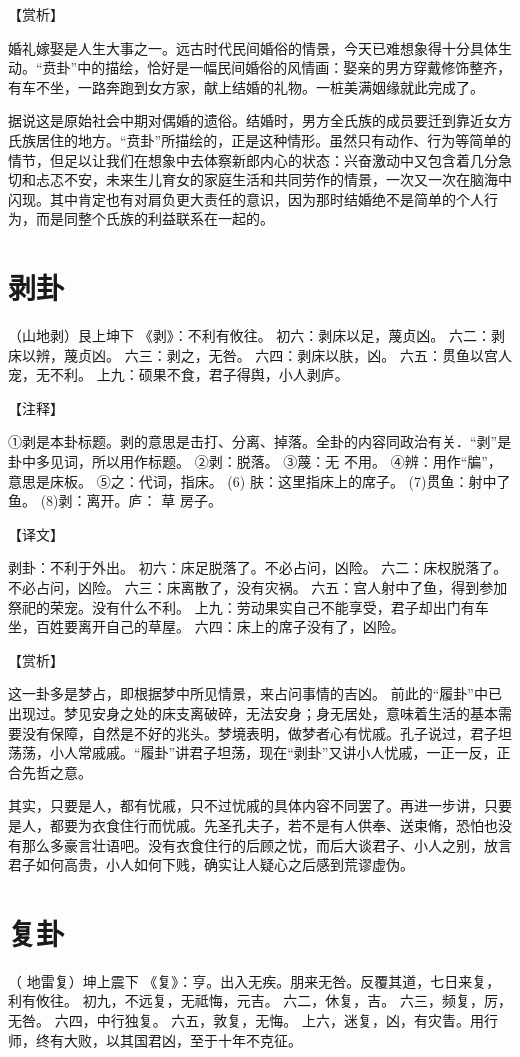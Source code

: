\documentclass[a4paper,12pt,UTF8,twoside]{ctexbook}
\begin{document}
【赏析】

婚礼嫁娶是人生大事之一。远古时代民间婚俗的情景，今天已难想象得十分具体生动。“贲卦”中的描绘，恰好是一幅民间婚俗的风情画：娶亲的男方穿戴修饰整齐，有车不坐，一路奔跑到女方家，献上结婚的礼物。一桩美满姻缘就此完成了。

据说这是原始社会中期对偶婚的遗俗。结婚时，男方全氏族的成员要迁到靠近女方氏族居住的地方。“贲卦”所描绘的，正是这种情形。虽然只有动作、行为等简单的情节，但足以让我们在想象中去体察新郎内心的状态：兴奋激动中又包含着几分急切和忐忑不安，未来生儿育女的家庭生活和共同劳作的情景，一次又一次在脑海中闪现。其中肯定也有对肩负更大责任的意识，因为那时结婚绝不是简单的个人行为，而是同整个氏族的利益联系在一起的。


\chapter{剥卦}
（山地剥）艮上坤下
《剥》：不利有攸往。
初六：剥床以足，蔑贞凶。
六二：剥床以辨，蔑贞凶。
六三：剥之，无咎。
六四：剥床以肤，凶。
六五：贯鱼以宫人宠，无不利。
上九：硕果不食，君子得舆，小人剥庐。

【注释】

①剥是本卦标题。剥的意思是击打、分离、掉落。全卦的内容同政治有关．“剥”是卦中多见词，所以用作标题。
②剥：脱落。
③蔑：无 不用。
④辨：用作“牑”，意思是床板。
⑤之：代词，指床。
(6) 肤：这里指床上的席子。
(7)贯鱼：射中了鱼。
(8)剥：离开。庐： 草 房子。

【译文】

剥卦：不利于外出。
初六：床足脱落了。不必占问，凶险。
六二：床权脱落了。不必占问，凶险。
六三：床离散了，没有灾祸。
六五：宫人射中了鱼，得到参加祭祀的荣宠。没有什么不利。
上九：劳动果实自己不能享受，君子却出门有车坐，百姓要离开自己的草屋。
六四：床上的席子没有了，凶险。

【赏析】

这一卦多是梦占，即根据梦中所见情景，来占问事情的吉凶。 前此的“履卦”中已出现过。梦见安身之处的床支离破碎，无法安身；身无居处，意味着生活的基本需要没有保障，自然是不好的兆头。梦境表明，做梦者心有忧戚。孔子说过，君子坦荡荡，小人常戚戚。“履卦”讲君子坦荡，现在“剥卦”又讲小人忧戚，一正一反，正合先哲之意。

其实，只要是人，都有忧戚，只不过忧戚的具体内容不同罢了。再进一步讲，只要是人，都要为衣食住行而忧戚。先圣孔夫子，若不是有人供奉、送束脩，恐怕也没有那么多豪言壮语吧。没有衣食住行的后顾之忧，而后大谈君子、小人之别，放言君子如何高贵，小人如何下贱，确实让人疑心之后感到荒谬虚伪。
\chapter{复卦}
（ 地雷复）坤上震下
《复》：亨。出入无疾。朋来无咎。反覆其道，七日来复，利有攸往。
初九，不远复，无祗悔，元吉。
六二，休复，吉。
六三，频复，厉，无咎。
六四，中行独复。
六五，敦复，无悔。
上六，迷复，凶，有灾眚。用行师，终有大败，以其国君凶，至于十年不克征。
\end{document}
